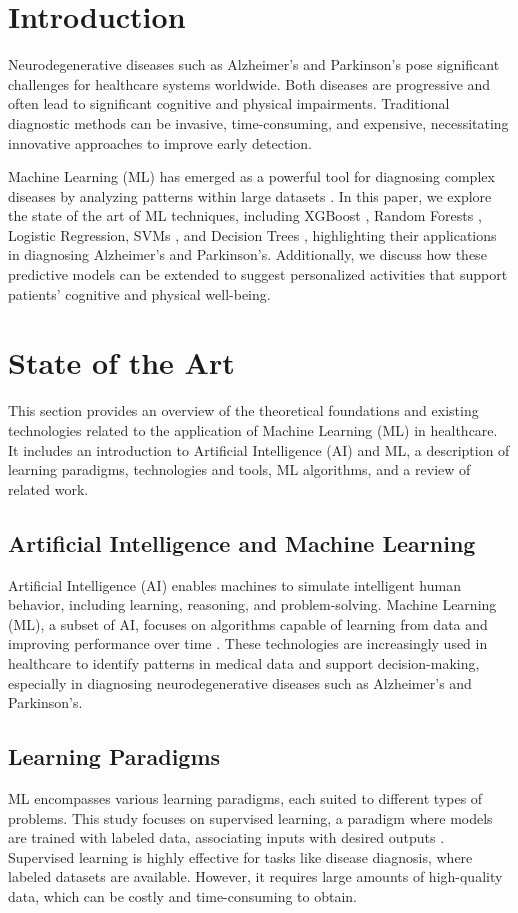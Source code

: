 \documentclass[conference]{IEEEtran}
\begin{document}
\section{Introduction}
Neurodegenerative diseases such as Alzheimer’s and Parkinson’s pose significant challenges for healthcare systems worldwide. Both diseases are progressive and often lead to significant cognitive and physical impairments. Traditional diagnostic methods can be invasive, time-consuming, and expensive, necessitating innovative approaches to improve early detection.

Machine Learning (ML) has emerged as a powerful tool for diagnosing complex diseases by analyzing patterns within large datasets \cite{b1}. In this paper, we explore the state of the art of ML techniques, including XGBoost \cite{b1}, Random Forests \cite{b2}, Logistic Regression, SVMs \cite{b3}, and Decision Trees \cite{b7}, highlighting their applications in diagnosing Alzheimer’s and Parkinson’s. Additionally, we discuss how these predictive models can be extended to suggest personalized activities that support patients' cognitive and physical well-being.

\section{State of the Art}
This section provides an overview of the theoretical foundations and existing technologies related to the application of Machine Learning (ML) in healthcare. It includes an introduction to Artificial Intelligence (AI) and ML, a description of learning paradigms, technologies and tools, ML algorithms, and a review of related work.

\subsection{Artificial Intelligence and Machine Learning}
Artificial Intelligence (AI) enables machines to simulate intelligent human behavior, including learning, reasoning, and problem-solving. Machine Learning (ML), a subset of AI, focuses on algorithms capable of learning from data and improving performance over time \cite{b1}. These technologies are increasingly used in healthcare to identify patterns in medical data and support decision-making, especially in diagnosing neurodegenerative diseases such as Alzheimer’s and Parkinson’s.

\subsection{Learning Paradigms}
ML encompasses various learning paradigms, each suited to different types of problems. This study focuses on supervised learning, a paradigm where models are trained with labeled data, associating inputs with desired outputs \cite{b2}. Supervised learning is highly effective for tasks like disease diagnosis, where labeled datasets are available. However, it requires large amounts of high-quality data, which can be costly and time-consuming to obtain.
\end{document}
